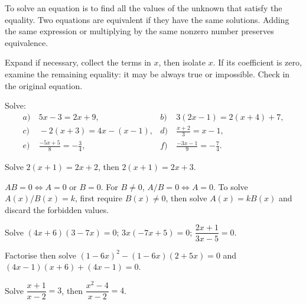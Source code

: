 \begin{keypoint}[Definition]
To solve an equation is to find all the values of the unknown that satisfy the equality. Two equations are equivalent if they have the same solutions. Adding the same expression or multiplying by the same nonzero number preserves equivalence.
\end{keypoint}
\begin{method}
Expand if necessary, collect the terms in $x$, then isolate $x$. If its coefficient is zero, examine the remaining equality: it may be always true or impossible. Check in the original equation.
\end{method}
\begin{example}Solve:
\begin{align*}
a)&\ 5x-3=2x+9,& b)&\ 3(2x-1)=2(x+4)+7,\\
c)&\ -2(x+3)=4x-(x-1),&d)&\ \frac{x+2}{3}=x-1,\\
e)&\ \frac{-5x+5}{8}=-\frac34,&f)&\ \frac{-3x-1}{9}=-\frac74.
\end{align*}\end{example}
\begin{example}Solve $2(x+1)=2x+2$, then $2(x+1)=2x+3$.\end{example}

\begin{keypoint}[Properties]
$AB=0\iff A=0$ or $B=0$. For $B\ne0$, $A/B=0\iff A=0$. To solve $A(x)/B(x)=k$, first require $B(x)\ne0$, then solve $A(x)=kB(x)$ and discard the forbidden values.
\end{keypoint}
\begin{example}Solve $(4x+6)(3-7x)=0$; $3x(-7x+5)=0$; $\dfrac{2x+1}{3x-5}=0$.\end{example}
\begin{example}Factorise then solve $(1-6x)^2-(1-6x)(2+5x)=0$ and $(4x-1)(x+6)+(4x-1)=0$.\end{example}
\begin{example}Solve $\dfrac{x+1}{x-2}=3$, then $\dfrac{x^2-4}{x-2}=4$.\end{example}

